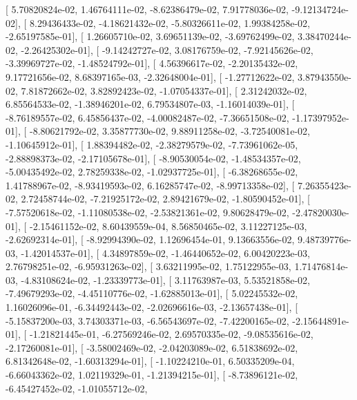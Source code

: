 \documentclass{article}
\begin{document}
       [  5.70820824e-02,   1.46764111e-02,  -8.62386479e-02,
          7.91778036e-02,  -9.12134724e-02],
       [  8.29436433e-02,  -4.18621432e-02,  -5.80326611e-02,
          1.99384258e-02,  -2.65197585e-01],
       [  1.26605710e-02,   3.69651139e-02,  -3.69762499e-02,
          3.38470244e-02,  -2.26425302e-01],
       [ -9.14242727e-02,   3.08176759e-02,  -7.92145626e-02,
         -3.39969727e-02,  -1.48524792e-01],
       [  4.56396617e-02,  -2.20135432e-02,   9.17721656e-02,
          8.68397165e-03,  -2.32648004e-01],
       [ -1.27712622e-02,   3.87943550e-02,   7.81872662e-02,
          3.82892423e-02,  -1.07054337e-01],
       [  2.31242032e-02,   6.85564533e-02,  -1.38946201e-02,
          6.79534807e-03,  -1.16014039e-01],
       [ -8.76189557e-02,   6.45856437e-02,  -4.00082487e-02,
         -7.36651508e-02,  -1.17397952e-01],
       [ -8.80621792e-02,   3.35877730e-02,   9.88911258e-02,
         -3.72540081e-02,  -1.10645912e-01],
       [  1.88394482e-02,  -2.38279579e-02,  -7.73961062e-05,
         -2.88898373e-02,  -2.17105678e-01],
       [ -8.90530054e-02,  -1.48534357e-02,  -5.00435492e-02,
          2.78259338e-02,  -1.02937725e-01],
       [ -6.38268655e-02,   1.41788967e-02,  -8.93419593e-02,
          6.16285747e-02,  -8.99713358e-02],
       [  7.26355423e-02,   2.72458744e-02,  -7.21925172e-02,
          2.89421679e-02,  -1.80590452e-01],
       [ -7.57520618e-02,  -1.11080538e-02,  -2.53821361e-02,
          9.80628479e-02,  -2.47820030e-01],
       [ -2.15461152e-02,   8.60439559e-04,   8.56850465e-02,
          3.11227125e-03,  -2.62692314e-01],
       [ -8.92994390e-02,   1.12696454e-01,   9.13663556e-02,
          9.48739776e-03,  -1.42014537e-01],
       [  4.34897859e-02,  -1.46440652e-02,   6.00420223e-03,
          2.76798251e-02,  -6.95931263e-02],
       [  3.63211995e-02,   1.75122955e-03,   1.71476814e-03,
         -4.83108624e-02,  -1.23339773e-01],
       [  3.11763987e-03,   5.53521858e-02,  -7.49679293e-02,
         -4.45110776e-02,  -1.62885013e-01],
       [  5.02245532e-02,   1.16026096e-01,  -6.34492443e-02,
         -2.02696616e-03,  -2.13657438e-01],
       [ -5.15837200e-03,   3.74303371e-03,  -6.56543697e-02,
         -7.42200165e-02,  -2.15644891e-01],
       [ -1.21821445e-01,  -6.27569246e-02,   2.69570335e-02,
         -9.08535616e-02,  -2.17260081e-01],
       [ -3.58002469e-02,  -2.04203089e-02,   6.51838692e-02,
          6.81342648e-02,  -1.60313294e-01],
       [ -1.10224210e-01,   6.50335209e-04,  -6.66043362e-02,
          1.02119329e-01,  -1.21394215e-01],
       [ -8.73896121e-02,  -6.45427452e-02,  -1.01055712e-02,
\end{document}
